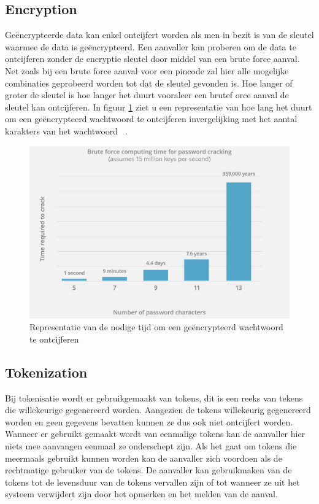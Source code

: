 \subsection{Encryption}
Geëncrypteerde data kan enkel ontcijfert worden als men in bezit is van de sleutel waarmee de data is geëncrypteerd. Een aanvaller kan proberen om de data te ontcijferen zonder de encryptie sleutel door middel van een brute force aanval. Net zoals bij een brute force aanval voor een pincode zal hier alle mogelijke combinaties geprobeerd worden tot dat de sleutel gevonden is. Hoe langer of groter de sleutel is hoe langer het duurt vooraleer een brutef orce aanval de sleutel kan ontcijferen. In figuur \ref{fig:bruteForce} ziet u een representatie van hoe lang het duurt om een geëncrypteerd wachtwoord te ontcijferen invergelijking met het aantal karakters van het wachtwoord ~\autocite{BruteForce}.

 \begin{figure}
	\includegraphics[width=\linewidth]
	{img/bruteforce}
	\caption{Representatie van de nodige tijd om een geëncrypteerd wachtwoord te ontcijferen}
	\label{fig:bruteForce}
\end{figure}

\subsection{Tokenization}
Bij tokenisatie wordt er gebruikgemaakt van tokens, dit is een reeks van tekens die willekeurige gegenereerd worden. Aangezien de tokens willekeurig gegenereerd worden en geen gegevens bevatten kunnen ze dus ook niet ontcijfert worden. Wanneer er gebruikt gemaakt wordt van eenmalige tokens kan de aanvaller hier niets mee aanvangen eenmaal ze onderschept zijn. Als het gaat om tokens die meermaals gebruikt kunnen worden kan de aanvaller zich voordoen als de rechtmatige gebruiker van de tokens. De aanvaller kan gebruikmaken van de tokens tot de levensduur van de tokens vervallen zijn of tot wanneer ze uit het systeem verwijdert zijn door het opmerken en het melden van de aanval.

